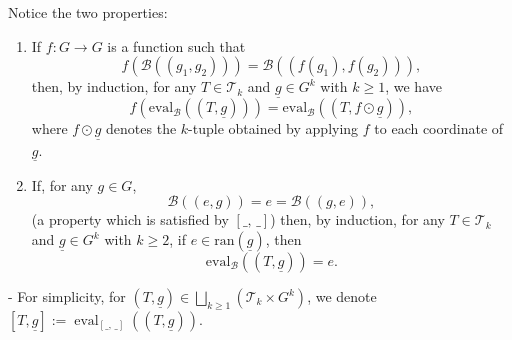 \documentclass[11pt, a4paper, oneside]{article}
\theoremstyle{remark}
\theoremstyle{lemma}
\begin{document}
Notice the two properties:
\begin{enumerate}
\item If \(f : G \rightarrow G\) is a function such that 
\[
f\!\left(\mathcal{B}\!\left(\left(g_1,g_2\right)\right)\right) = \mathcal{B}\!\left(\left(f(g_1), f(g_2)\right)\right),
\] 
then, by induction, for any 
\(T \in \mathcal{T}_k\) and \(\underline{g} \in G^k\) with \(k \geq 1\), we have 
\[
f\!\left(\mathrm{eval}_{\mathcal{B}}\!\left((T,\underline{g})\right)\right) 
= \mathrm{eval}_{\mathcal{B}}\!\left((T, f \odot \underline{g})\right),
\] 
where \(f \odot \underline{g}\) denotes the \(k\)-tuple obtained by applying \(f\) to each coordinate of \(\underline{g}\).

\item If, for any \(g \in G\), 
\[
\mathcal{B}\!\left(\left(e,g\right)\right) = e = \mathcal{B}\!\left(\left(g,e\right)\right),
\] 
(a property which is satisfied by \([\_,\,\_]\)) then, by induction, for any \(T \in \mathcal{T}_k\) and \(\underline{g} \in G^k\) with \(k \geq 2\), 
if \(e \in \mathrm{ran}(\underline{g})\), then 
\[
\mathrm{eval}_{\mathcal{B}}\!\left((T,\underline{g})\right) = e.
\]
\end{enumerate}


- For simplicity, for \((T, \underline{g}) \in \bigsqcup_{k \geq 1} \left( \mathcal{T}_k \times G^k \right)\), we denote \(\left[T, \underline{g}\right] := \operatorname{eval}_{[\_,\,\_]} \left( (T, \underline{g})\right)\).
\end{document}
